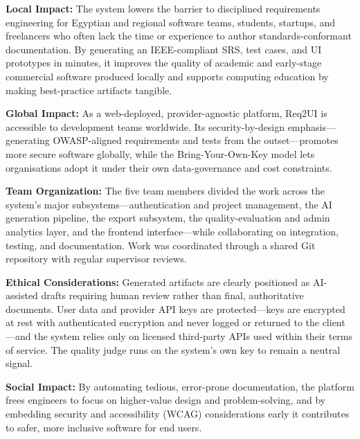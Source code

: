 \documentclass[12pt,a4paper,oneside]{report}
\begin{document}
\vspace{0.4em}
\noindent\textbf{Local Impact:} The system lowers the barrier to disciplined requirements engineering for Egyptian and regional software teams, students, startups, and freelancers who often lack the time or experience to author standards-conformant documentation. By generating an IEEE-compliant SRS, test cases, and UI prototypes in minutes, it improves the quality of academic and early-stage commercial software produced locally and supports computing education by making best-practice artifacts tangible.

\vspace{0.4em}
\noindent\textbf{Global Impact:} As a web-deployed, provider-agnostic platform, Req2UI is accessible to development teams worldwide. Its security-by-design emphasis---generating OWASP-aligned requirements and tests from the outset---promotes more secure software globally, while the Bring-Your-Own-Key model lets organisations adopt it under their own data-governance and cost constraints.

\vspace{0.4em}
\noindent\textbf{Team Organization:} The five team members divided the work across the system's major subsystems---authentication and project management, the AI generation pipeline, the export subsystem, the quality-evaluation and admin analytics layer, and the frontend interface---while collaborating on integration, testing, and documentation. Work was coordinated through a shared Git repository with regular supervisor reviews.

\vspace{0.4em}
\noindent\textbf{Ethical Considerations:} Generated artifacts are clearly positioned as AI-assisted drafts requiring human review rather than final, authoritative documents. User data and provider API keys are protected---keys are encrypted at rest with authenticated encryption and never logged or returned to the client---and the system relies only on licensed third-party APIs used within their terms of service. The quality judge runs on the system's own key to remain a neutral signal.

\vspace{0.4em}
\noindent\textbf{Social Impact:} By automating tedious, error-prone documentation, the platform frees engineers to focus on higher-value design and problem-solving, and by embedding security and accessibility (WCAG) considerations early it contributes to safer, more inclusive software for end users.
\end{document}
